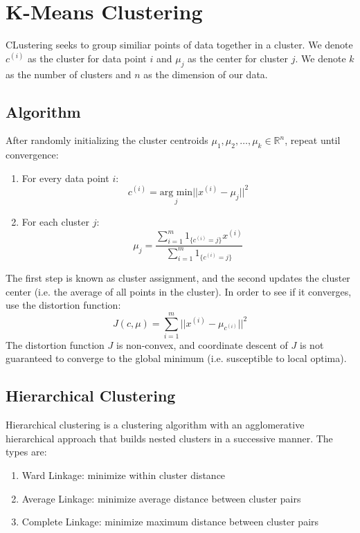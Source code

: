 \section{K-Means Clustering}
CLustering seeks to group similiar points of data together in a cluster. We
denote $c^{(i)}$ as the cluster for data point $i$ and $\mu_j$ as the center
for cluster $j$. We denote $k$ as the number of clusters and $n$ as the
dimension of our data.
\subsection{Algorithm}
After randomly initializing the cluster centroids
$\mu_1, \mu_2, \hdots, \mu_k \in \mathbb{R}^n$, repeat until convergence:
\begin{enumerate}
  \item For every data point $i$:
    \begin{equation}
      c^{(i)}=\underset{j}{\textrm{arg min}}||x^{(i)}-\mu_j||^2
    \end{equation}
  \item For each cluster $j$:
    \begin{equation}
      \mu_j=\frac{\displaystyle\sum_{i=1}^m1_{\{c^{(i)}=j\}}x^{(i)}}{\displaystyle\sum_{i=1}^m1_{\{c^{(i)}=j\}}}
    \end{equation}
\end{enumerate}
The first step is known as cluster assignment, and the second updates the
cluster center (i.e. the average of all points in the cluster). In order to
see if it converges, use the distortion function:
\begin{equation}
  J(c,\mu)=\sum_{i=1}^m||x^{(i)}-\mu_{c^{(i)}}||^2
\end{equation}
The distortion function $J$ is non-convex, and coordinate descent of $J$ is not
guaranteed to converge to the global minimum (i.e. susceptible to local optima).
\subsection{Hierarchical Clustering}
Hierarchical clustering is a clustering algorithm with an agglomerative
hierarchical approach that builds nested clusters in a successive manner. The
types are:
\begin{enumerate}
  \item Ward Linkage: minimize within cluster distance
  \item Average Linkage: minimize average distance between cluster pairs
  \item Complete Linkage: minimize maximum distance between cluster pairs
\end{enumerate}
